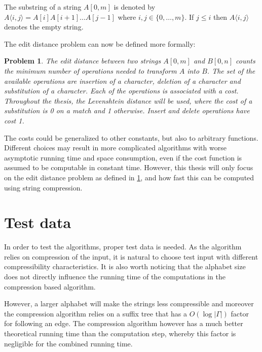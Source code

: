 \documentclass[twoside,11pt,openright]{report}
\newcommand{\substr}[3]{#1\langle #2, #3 \rangle}
\newcommand{\str}[3]{#1[#2, #3]}
\newtheorem{problem}{Problem}
\begin{document}
The substring of a string $\str{A}{0}{m}$ is denoted by $\substr{A}{i}{j} = A[i]A[i+1]\dots A[j - 1]$ where $i, j \in \{0, \dots, m\}$. If $j \leq i$ then $\substr{A}{i}{j}$ denotes the empty string.

The edit distance problem can now be defined more formally:
\begin{problem}
  \label{problem:edit-distance}
  The edit distance between two strings $\str{A}{0}{m}$ and $\str{B}{0}{n}$ counts the minimum number of operations needed to transform $A$ into $B$. The set of the available operations are insertion of a character, deletion of a character and substitution of a character. Each of the operations is associated with a cost. Throughout the thesis, the Levenshtein distance will be used, where the cost of a substitution is 0 on a match and 1 otherwise. Insert and delete operations have cost 1.
\end{problem}
The costs could be generalized to other constants, but also to arbitrary functions. Different choices may result in more complicated algorithms with worse asymptotic running time and space consumption, even if the cost function is assumed to be computable in constant time. However, this thesis will only focus on the edit distance problem as defined in \cref{problem:edit-distance}, and how fast this can be computed using string compression.

\section{Test data}
\label{sec:intro:test-data}
In order to test the algorithms, proper test data is needed. As the algorithm relies on compression of the input, it is natural to choose test input with different compressibility characteristics. It is also worth noticing that the alphabet size does not directly influence the running time of the computations in the compression based algorithm.

However, a larger alphabet will make the strings less compressible and moreover the compression algorithm relies on a suffix tree that has a $O(\log |\Gamma|)$ factor for following an edge. The compression algorithm however has a much better theoretical running time than the computation step, whereby this factor is negligible for the combined running time.
\end{document}
